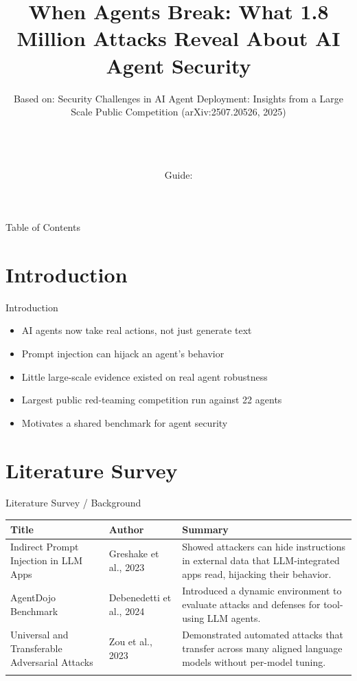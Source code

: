 \documentclass[10pt]{beamer}
\title[B.Tech Seminar]{When Agents Break: What 1.8 Million Attacks Reveal About AI Agent Security}
\subtitle{Based on: Security Challenges in AI Agent Deployment: Insights from a Large Scale Public Competition (arXiv:2507.20526, 2025)}
\author[\studentname\ (\shortinst)]{\studentname \\ \small \rollno \\ \small \rollclass \\ \small Guide: \guidename}
\institute[]{\deptname \\ \collegename}
\date{\seminardate}
\begin{document}
\begin{frame}[plain]
  \titlepage
\end{frame}

\begin{frame}{Table of Contents}
  \tableofcontents
\end{frame}

\section{Introduction}
\begin{frame}{Introduction}
\begin{itemize}
  \item AI agents now take real actions, not just generate text
  \item Prompt injection can hijack an agent's behavior
  \item Little large-scale evidence existed on real agent robustness
  \item Largest public red-teaming competition run against 22 agents
  \item Motivates a shared benchmark for agent security
\end{itemize}
\end{frame}

\section{Literature Survey}
\begin{frame}{Literature Survey / Background}
  \small
  \begin{tabular}{@{}p{2.7cm}p{2.3cm}p{5.6cm}@{}}
    \toprule
    \textbf{Title} & \textbf{Author} & \textbf{Summary} \\
    \midrule
    Indirect Prompt Injection in LLM Apps & Greshake et al., 2023 & Showed attackers can hide instructions in external data that LLM-integrated apps read, hijacking their behavior. \\
    \addlinespace
    AgentDojo Benchmark & Debenedetti et al., 2024 & Introduced a dynamic environment to evaluate attacks and defenses for tool-using LLM agents. \\
    \addlinespace
    Universal and Transferable Adversarial Attacks & Zou et al., 2023 & Demonstrated automated attacks that transfer across many aligned language models without per-model tuning. \\
    \addlinespace
    \bottomrule
  \end{tabular}
\end{frame}
\end{document}
